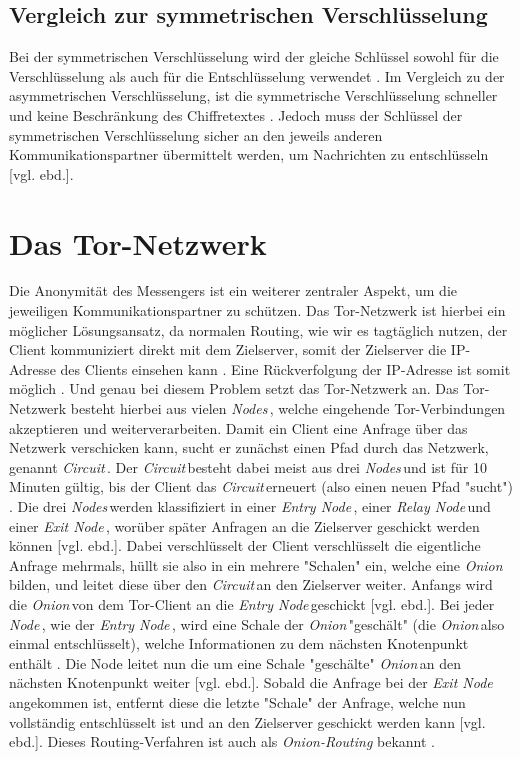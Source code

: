 \documentclass[a4paper,ngerman, headheight=28pt,12pt]{scrartcl}
\newcommand{\vcite}[1]{\cite[vgl.][]{#1}}
\newcommand{\vebd}{[vgl. ebd.]}
\newcommand{\entryn}{\textit{Entry Node\,}}
\newcommand{\relayn}{\textit{Relay Node\,}}
\newcommand{\exitn}{\textit{Exit Node\,}}
\newcommand{\nodes}{\textit{Nodes\,}}
\newcommand{\node}{\textit{Node\,}}
\newcommand{\onion}{\textit{Onion\,}}
\newcommand{\circuit}{\textit{Circuit\,}}
\begin{document}
\subsection{Vergleich zur symmetrischen Verschlüsselung}
Bei der symmetrischen Verschlüsselung wird der gleiche Schlüssel sowohl für die Verschlüsselung als auch für die Entschlüsselung verwendet \vcite{GeneralSymmetricCryptography}.
Im Vergleich zu der asymmetrischen Verschlüsselung, ist die symmetrische Verschlüsselung schneller und keine Beschränkung des Chiffretextes \vcite{RsaAESAnalysis, OpensslRsaMaxLength}. Jedoch muss der Schlüssel der symmetrischen Verschlüsselung sicher an den jeweils anderen Kommunikationspartner übermittelt werden, um Nachrichten zu entschlüsseln \vebd.

\section{Das Tor-Netzwerk}
Die Anonymität des Messengers ist ein weiterer zentraler Aspekt, um die jeweiligen Kommunikationspartner zu schützen. Das Tor-Netzwerk ist hierbei ein möglicher Lösungsansatz, da normalen Routing, wie wir es tagtäglich nutzen, der Client kommuniziert  direkt mit dem Zielserver, somit der Zielserver die IP-Adresse des Clients einsehen kann \vcite{TCP_IP}.
Eine Rückverfolgung der IP-Adresse ist somit möglich \vcite{LocPolice}. Und genau bei diesem Problem setzt das Tor-Netzwerk an. Das Tor-Netzwerk besteht hierbei aus vielen \nodes, welche eingehende Tor-Verbindungen akzeptieren und weiterverarbeiten. Damit ein Client eine Anfrage über das Netzwerk verschicken kann, sucht er zunächst einen Pfad durch das Netzwerk, genannt \circuit \vcite{TorCircuits}. Der \circuit besteht dabei meist aus drei \nodes und ist für 10 Minuten gültig, bis der Client das \circuit erneuert (also einen neuen Pfad "sucht")  \vcite{FAQCircuitLifetime}. Die drei \nodes werden klassifiziert in einer \entryn, einer \relayn und einer \exitn, worüber später Anfragen an die Zielserver geschickt werden können \vebd.
Dabei verschlüsselt der Client verschlüsselt die eigentliche Anfrage mehrmals, hüllt sie also in ein mehrere "Schalen" ein, welche eine \onion bilden, und leitet diese über den \circuit an den Zielserver weiter\vcite{TorDesign}. Anfangs wird die \onion von dem Tor-Client an die \entryn geschickt \vebd. Bei jeder \node, wie der \entryn, wird eine Schale der \onion "geschält" (die \onion also einmal entschlüsselt), welche Informationen zu dem nächsten Knotenpunkt enthält \vcite{TorStructure2}. Die Node leitet nun die um eine Schale "geschälte" \onion an den nächsten Knotenpunkt weiter \vebd.
Sobald die Anfrage bei der \exitn angekommen ist, entfernt diese die letzte "Schale" der Anfrage, welche nun vollständig entschlüsselt ist und an den Zielserver geschickt werden kann \vebd. Dieses Routing-Verfahren ist auch als \textit{Onion-Routing} bekannt \vcite{TorDesign}.
\end{document}
